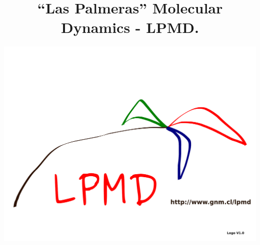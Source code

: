 \documentclass[a4paper,10pt]{scrbook}
\begin{document}
\author{\includegraphics[scale=.35]{logo-lpmd.pdf}}
\title{``Las Palmeras'' Molecular Dynamics - \textbf{LPMD}.}
\maketitle
\newpage\pagestyle{empty}\tableofcontents\newpage
\pagestyle{fancy}



\end{document}
